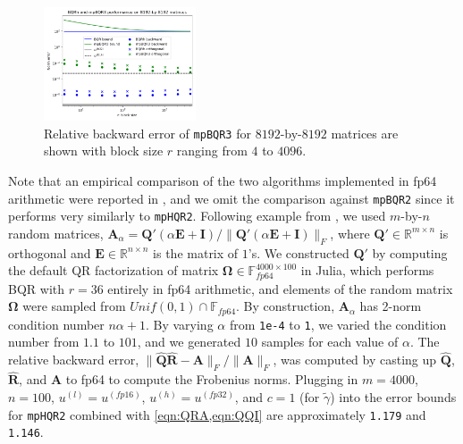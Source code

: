 \documentclass[review,onefignum,onetabnum]{siamart190516}
\newcommand{\R}{\mathbb{R}}
\newcommand{\F}{\mathbb{F}}
\newcommand{\bb}[1]{\mathbf{#1}}
\begin{document}
\begin{figure}
	\centering
	\vspace{-10pt}
	\includegraphics[width=0.4\textwidth]{./figures/mpBQR3-blocksize.png}
	\caption{\label{fig:mpBQR3}Relative backward error of {\tt mpBQR3} for $8192$-by-$8192$ matrices are shown with block size $r$ ranging from $4$ to $4096$.}
	\vspace{-10pt}
\end{figure}
Note that an empirical comparison of the two algorithms implemented in fp64 arithmetic were reported in \cite{Mori2012}, and we omit the comparison against {\tt mpBQR2} since it performs very similarly to {\tt mpHQR2}.
Following example from \cite{Mori2012}, we used $m$-by-$n$ random matrices, $\bb{A}_{\alpha} = \bb{Q'}(\alpha \bb{E} + \bb{I})/\|\bb{Q'}(\alpha \bb{E} + \bb{I})\|_F$,
where $\bb{Q'}\in\mathbb{R}^{m\times n}$ is orthogonal and $\bb{E}\in\R^{n\times n}$ is the matrix of $1$'s. 
We constructed $\bb{Q'}$ by computing the default QR factorization of matrix $\bb{\Omega}\in\F_{fp64}^{4000\times100}$ in Julia, which performs BQR with $r=36$ entirely in fp64 arithmetic, and elements of the random matrix $\bb{\Omega}$ were sampled from $Unif(0,1)\cap \F_{fp64}$.
By construction, $\bb{A}_{\alpha}$ has 2-norm condition number $n\alpha+1$. 
By varying $\alpha$ from {\tt 1e-4} to {\tt 1}, we varied the condition number from $1.1$ to $101$, and we generated $10$ samples for each value of $\alpha$.
The relative backward error, $\|\hat{\bb{Q}}\hat{\bb{R}}-\bb{A}\|_F/\|\bb{A}\|_F$, was computed by casting up $\hat{\bb{Q}}$, $\hat{\bb{R}}$, and $\bb{A}$ to fp64 to compute the Frobenius norms.
Plugging in $m=4000$, $n=100$, $u^{(l)}=u^{(fp16)}$, $u^{(h)}=u^{(fp32)}$, and $c=1$ (for $\tilde{\gamma}$) into the error bounds for {\tt mpHQR2} combined with \cref{eqn:QRA,eqn:QQI} are approximately {\tt 1.179} and {\tt 1.146}.
\end{document}
